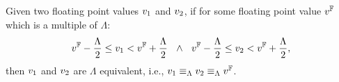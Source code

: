 \documentclass[a4paper,11pt]{article}
\begin{document}
\begin{defn}
Given two floating point values $v_1$ and $v_2$, if for some floating point value $v^{\mathbb{F}}$ which is a multiple of $\Lambda$:
\[
	v^{\mathbb{F}} - \frac{\Lambda}{2} \leq v_1 < v^{\mathbb{F}} + \frac{\Lambda}{2}
	~~
	\land
	~~
	v^{\mathbb{F}} - \frac{\Lambda}{2} \leq v_2 < v^{\mathbb{F}} + \frac{\Lambda}{2},	
\]
then $v_1$ and $v_2$ are $\Lambda$ equivalent, i.e., 
$v_1 \equiv_{\Lambda} v_2 \equiv_{\Lambda} v^{\mathbb{F}}$.
\end{defn}
%
\end{document}
